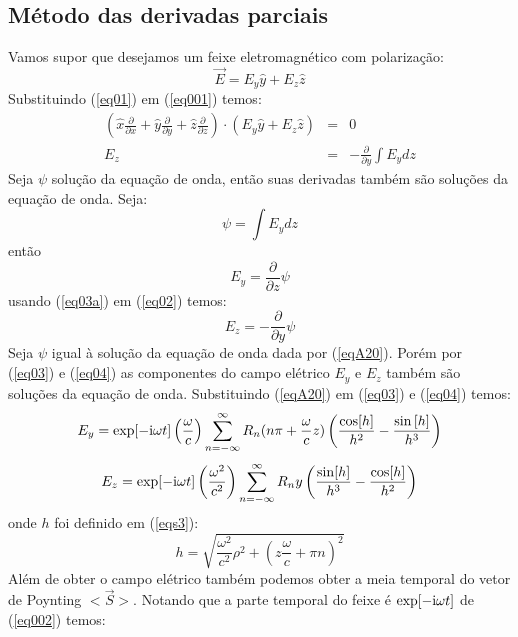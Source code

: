\subsection{M\'etodo das derivadas parciais}
Vamos supor que desejamos um feixe eletromagn\'etico com polariza\c{c}\~ao:
\begin{equation}\label{eq01}
\vec{E}=E_{y}\hat{y} + E_z\hat{z}
\end{equation}
Substituindo (\ref{eq01}) em (\ref{eq001}) temos:
\begin{eqnarray}
 \left(\hat{x}\frac{\partial}{\partial x}+\hat{y}\frac{\partial}{\partial y}+\hat{z}\frac{\partial}{\partial z}\right)\cdot (E_{y}\hat{y}+E_z\hat{z}) & = & 0 \nonumber\\
 E_z & = & -\frac{\partial}{\partial y}\int E_{y}dz\label{eq02}
\end{eqnarray}
Seja $\psi$ solu\c{c}\~ao da equa\c{c}\~ao de onda, ent\~ao suas derivadas tamb\'em s\~ao solu\c{c}\~oes da equa\c{c}\~ao de onda. Seja:
\begin{equation}\label{eq03a}
\psi =\int E_y dz
\end{equation}
ent\~ao
\begin{equation}\label{eq03}
E_y= \frac{\partial}{\partial z}\psi
\end{equation}
 usando (\ref{eq03a}) em (\ref{eq02}) temos:
\begin{equation}\label{eq04}
E_z= -\frac{\partial}{\partial y}\psi
\end{equation}
Seja $\psi$ igual \`a solu\c{c}\~ao da equa\c{c}\~ao de onda dada por (\ref{eqA20}). Por\'em por (\ref{eq03}) e (\ref{eq04}) as componentes do campo el\'etrico $E_y$ e $E_z$ tamb\'em s\~ao solu\c{c}\~oes da equa\c{c}\~ao de onda. Substituindo (\ref{eqA20}) em (\ref{eq03}) e (\ref{eq04}) temos:
\begin{equation}\label{eq05}
E_y= \exp[-{\rm i}\omega t]\left(\frac{\omega}{c}\right)\sum\limits_{n=-\infty}^{\infty}R_n  (n \pi +\frac{\omega}{c} z )  \left(\frac{\cos[h]}{h^2} -\frac{\sin\left[h\right]}{h^3}\right)
\end{equation}
\begin{equation}\label{eq06}
E_z= \exp[-{\rm i}\omega t]\left(\frac{\omega^2}{c^2}\right)\sum\limits_{n=-\infty}^{\infty}R_n y \left(\frac{\sin[h]}{h^3}-\frac{\cos[h]}{h^2}\right)
\end{equation}
onde $h$ foi definido em (\ref{eqs3}):
$$ h = \sqrt{\frac{\omega^2}{c^2}\rho^2+(z\frac{\omega}{c}+\pi n)^2}$$
Al\'em de obter o campo el\'etrico tamb\'em podemos obter a meia temporal do vetor de Poynting $<\vec{S}>$. Notando que a parte temporal do feixe \'e $ \exp[-{\rm i}\omega t]$ de (\ref{eq002}) temos:
